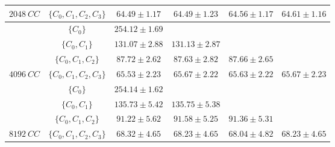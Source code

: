 \begin{tabular}{|c|c||c|c|c|c|}
        \cline{2-6}
        \multirow{-4}{*}{$2048~CC$} & $\{C_{0}, C_{1}, C_{2}, C_{3}\}$      & $64.49 \pm 1.17$    & $64.49 \pm 1.23$    & $64.56 \pm 1.17$            &  $64.61 \pm 1.16$                  \\
        \hline
        \hline
                                    & $\{C_{0}\}$                           & $254.12 \pm 1.69$    & \cellcolor[HTML]{C0C0C0}        & \cellcolor[HTML]{C0C0C0}                & \cellcolor[HTML]{C0C0C0}                       \\
        \cline{2-6}
                                    & $\{C_{0}, C_{1}\}$                    & $131.07 \pm 2.88$    & $131.13 \pm 2.87$    & \cellcolor[HTML]{C0C0C0}                & \cellcolor[HTML]{C0C0C0}                       \\
        \cline{2-6}
                                    & $\{C_{0}, C_{1}, C_{2}\}$             & $87.72 \pm 2.62$    & $87.63 \pm 2.82$    & $87.66 \pm 2.65$            & \cellcolor[HTML]{C0C0C0}                       \\
        \cline{2-6}
        \multirow{-4}{*}{$4096~CC$} & $\{C_{0}, C_{1}, C_{2}, C_{3}\}$      & $65.53 \pm 2.23$    & $65.67 \pm 2.22$    & $65.63 \pm 2.22$            &  $65.67 \pm 2.23$                  \\
        \hline
        \hline
                                    & $\{C_{0}\}$                           & $254.14 \pm 1.62$    & \cellcolor[HTML]{C0C0C0}        & \cellcolor[HTML]{C0C0C0}                & \cellcolor[HTML]{C0C0C0}                       \\
        \cline{2-6}
                                    & $\{C_{0}, C_{1}\}$                    & $135.73 \pm 5.42$    & $135.75 \pm 5.38$    & \cellcolor[HTML]{C0C0C0}                & \cellcolor[HTML]{C0C0C0}                       \\
        \cline{2-6}
                                    & $\{C_{0}, C_{1}, C_{2}\}$             & $91.22 \pm 5.62$    & $91.58 \pm 5.25$    & $91.36 \pm 5.31$            & \cellcolor[HTML]{C0C0C0}                       \\
        \cline{2-6}
        \multirow{-4}{*}{$8192~CC$} & $\{C_{0}, C_{1}, C_{2}, C_{3}\}$      & $68.32 \pm 4.65$    & $68.23 \pm 4.65$    & $68.04 \pm 4.82$            &  $68.23 \pm 4.65$                  \\
        \hline
    \end{tabular}

